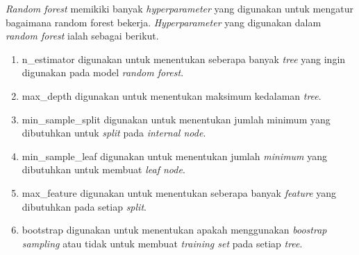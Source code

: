 \textit{Random forest} memikiki banyak \textit{hyperparameter} yang digunakan untuk mengatur bagaimana random forest bekerja. \textit{Hyperparameter} yang digunakan dalam \textit{random forest} ialah sebagai berikut.
\begin{enumerate}[noitemsep]
    \item n\_estimator digunakan untuk menentukan seberapa banyak \textit{tree} yang ingin digunakan pada model \textit{random forest}.
    \item max\_depth digunakan untuk menentukan maksimum kedalaman \textit{tree}.
    \item min\_sample\_split digunakan untuk menentukan jumlah minimum yang dibutuhkan untuk \textit{split} pada \textit{internal node}.
    \item min\_sample\_leaf digunakan untuk menentukan jumlah \textit{minimum} yang dibutuhkan untuk membuat \textit{leaf node}.
    \item max\_feature digunakan untuk menentukan seberapa banyak \textit{feature} yang dibutuhkan pada setiap \textit{split}.
    \item bootstrap digunakan untuk menentukan apakah menggunakan \textit{boostrap sampling} atau tidak untuk membuat \textit{training set} pada setiap \textit{tree}.
\end{enumerate}


